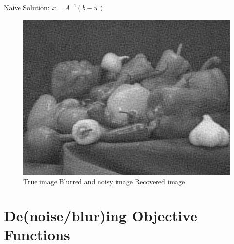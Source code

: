 \documentclass[12pt]{beamer}
\begin{document}
\begin{frame}{Naive Solution: $x = A^{-1}(b-w)$}
\begin{figure}
\includegraphics[scale=0.2]{../figures/fig5} \\
\small{\hspace{1em} True image \hspace{2em} Blurred and noisy image \hspace{1em} Recovered image}
\end{figure}
\end{frame}

\section{De(noise/blur)ing Objective Functions}
\end{document}
